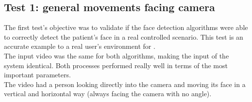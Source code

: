 \documentclass[11pt]{report} %
\begin{document}
\subsection{Test 1: general movements facing camera}
\label{sec:test_1_general_movements_facing_cameras}

The first test's objective was to validate if the face detection algorithms were able to correctly detect the patient's face in a real controlled scenario. This test is an accurate example to a real user's environment for .\\

The input video was the same for both algorithms, making the input of the system identical. Both processes performed really well in terms of the most important parameters.\\

The video had a person looking directly into the camera and moving its face in a vertical and horizontal way (always facing the camera with no angle).\\
\end{document}
